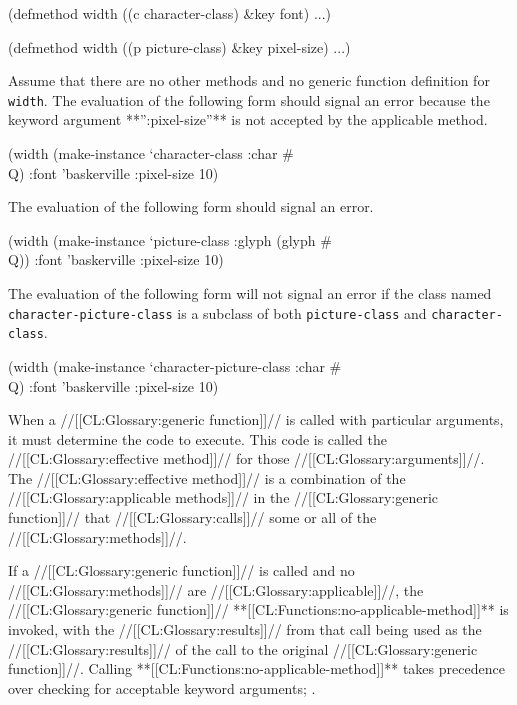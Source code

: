 \code
 (defmethod width ((c character-class) &key font) ...)
 
 (defmethod width ((p picture-class) &key pixel-size) ...)
\endcode

\noindent Assume that there are no other methods and no generic
function definition for {\tt width}. The evaluation of the
following form should signal an error because 
the keyword argument **'':pixel-size''** is not accepted by the applicable method.

\code
 (width (make-instance `character-class :char #\\Q) 
        :font 'baskerville :pixel-size 10)
\endcode

The evaluation of the following form should signal an error.

\code
 (width (make-instance `picture-class :glyph (glyph #\\Q)) 
        :font 'baskerville :pixel-size 10)
\endcode

The evaluation of the following form will not signal an error
if the class named {\tt character-picture-class} is a subclass of
both {\tt picture-class} and {\tt character-class}.

\code
 (width (make-instance `character-picture-class :char #\\Q)
        :font 'baskerville :pixel-size 10)
\endcode

\endsubsubsection%

\endSubsection%


When a //[[CL:Glossary:generic function]]// is called with particular arguments, it must
determine the code to execute.  This code is called the 
//[[CL:Glossary:effective method]]// for those //[[CL:Glossary:arguments]]//.
The //[[CL:Glossary:effective method]]// is a 
combination of the //[[CL:Glossary:applicable methods]]// in the //[[CL:Glossary:generic function]]//
that //[[CL:Glossary:calls]]// some or all of the //[[CL:Glossary:methods]]//.




If a //[[CL:Glossary:generic function]]// is called and no //[[CL:Glossary:methods]]// are 
//[[CL:Glossary:applicable]]//, the //[[CL:Glossary:generic function]]// **[[CL:Functions:no-applicable-method]]**
is invoked, with the //[[CL:Glossary:results]]// from that call being used as the
//[[CL:Glossary:results]]// of the call to the original //[[CL:Glossary:generic function]]//.  Calling
**[[CL:Functions:no-applicable-method]]** takes precedence over checking for acceptable
keyword arguments; \seesection\KwdArgsInGFsAndMeths.



